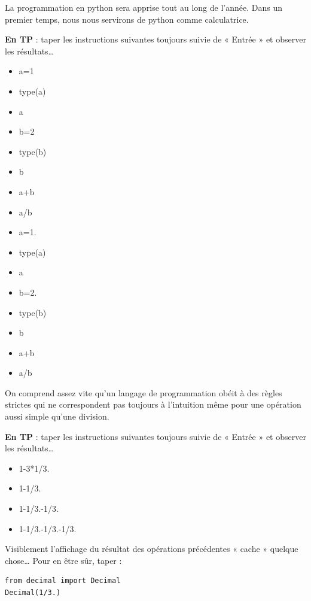 La programmation en python sera apprise tout au long de l'année. Dans un premier temps, nous nous servirons de python comme calculatrice.

\newpage
\textbf{En TP} : taper les instructions suivantes toujours suivie de « Entrée » et observer les résultats\dots

\ttfamily
\begin{itemize}
 \item[] a=1
 \item[] type(a)
 \item[] a
 \item[] b=2
 \item[] type(b)
 \item[] b
 \item[] a+b
 \item[] a/b
 \item[] a=1.
 \item[] type(a)
 \item[] a
 \item[] b=2.
 \item[] type(b)
 \item[] b
 \item[] a+b
 \item[] a/b
\end{itemize}

\rmfamily

On comprend assez vite qu'un langage de programmation obéit à des règles strictes qui ne correspondent pas toujours à l'intuition même pour une opération aussi simple qu'une division.

\textbf{En TP} : taper les instructions suivantes toujours suivie de « Entrée » et observer les résultats\dots

\ttfamily

\begin{itemize}
 \item[] 1-3*1/3.
 \item[] 1-1/3.
 \item[] 1-1/3.-1/3.
 \item[] 1-1/3.-1/3.-1/3.
\end{itemize}

\rmfamily

Visiblement l'affichage du résultat des opérations précédentes « cache » quelque chose{\dots} Pour en être sûr, taper :

\begin{verbatim}
from decimal import Decimal
Decimal(1/3.)
\end{verbatim}

